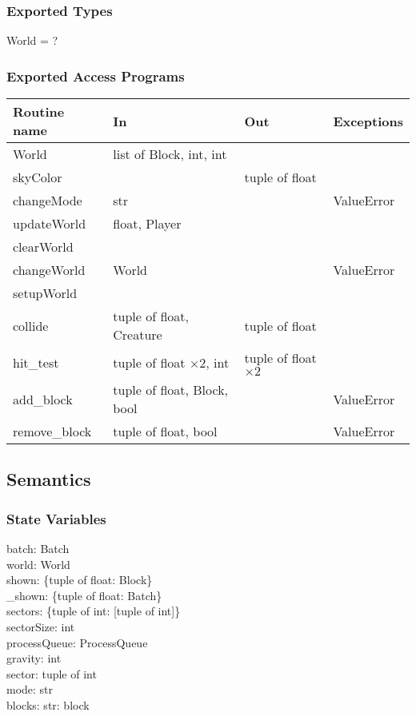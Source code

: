 \documentclass{article}
\begin{document}
\subsubsection {Exported Types}
World = ?

\subsubsection {Exported Access Programs}
\begin{table}[!htbp]
\begin{tabular}{| l | l | l | l |}
\hline
\textbf{Routine name} & \textbf{In} & \textbf{Out} & \textbf{Exceptions}\\
\hline
World & list of Block, int, int & ~ & ~\\
\hline
skyColor & ~ & tuple of float & ~\\
\hline
changeMode & str & ~ & ValueError\\
\hline
updateWorld & float, Player & ~ & ~\\
\hline
clearWorld & ~ & ~ & ~\\
\hline
changeWorld & World & ~ & ValueError\\
\hline
setupWorld & ~ & ~ & ~\\
\hline
collide & tuple of float, Creature & tuple of float & ~\\
\hline
hit\_test & tuple of float $\times 2$, int & tuple of float $\times 2$ & ~\\
\hline
add\_block & tuple of float, Block, bool & ~ & ValueError\\
\hline
remove\_block & tuple of float, bool & ~ & ValueError\\
\hline
\end{tabular}

\end{table}
\FloatBarrier

\subsection {Semantics}

\subsubsection {State Variables}
batch: Batch\\
world: World\\
shown: \{tuple of float: Block\}\\
\_shown: \{tuple of float: Batch\}\\
sectors: \{tuple of int: [tuple of int]\}\\
sectorSize: int\\
processQueue: ProcessQueue\\
gravity: int\\
sector: tuple of int\\
mode: str\\
blocks: {str: block}
\end{document}
